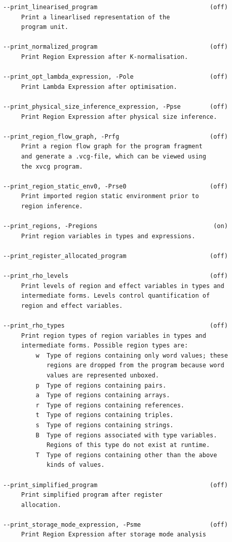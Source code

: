 \documentclass[12pt]{book}
\begin{document}
\begin{verbatim}
--print_linearised_program                               (off)
     Print a linearlised representation of the
     program unit.

--print_normalized_program                               (off)
     Print Region Expression after K-normalisation.

--print_opt_lambda_expression, -Pole                     (off)
     Print Lambda Expression after optimisation.

--print_physical_size_inference_expression, -Ppse        (off)
     Print Region Expression after physical size inference.

--print_region_flow_graph, -Prfg                         (off)
     Print a region flow graph for the program fragment
     and generate a .vcg-file, which can be viewed using
     the xvcg program.

--print_region_static_env0, -Prse0                       (off)
     Print imported region static environment prior to
     region inference.

--print_regions, -Pregions                                (on)
     Print region variables in types and expressions.

--print_register_allocated_program                       (off)

--print_rho_levels                                       (off)
     Print levels of region and effect variables in types and
     intermediate forms. Levels control quantification of
     region and effect variables.

--print_rho_types                                        (off)
     Print region types of region variables in types and
     intermediate forms. Possible region types are:
         w  Type of regions containing only word values; these
            regions are dropped from the program because word
            values are represented unboxed.
         p  Type of regions containing pairs.
         a  Type of regions containing arrays.
         r  Type of regions containing references.
         t  Type of regions containing triples.
         s  Type of regions containing strings.
         B  Type of regions associated with type variables.
            Regions of this type do not exist at runtime.
         T  Type of regions containing other than the above
            kinds of values.

--print_simplified_program                               (off)
     Print simplified program after register
     allocation.

--print_storage_mode_expression, -Psme                   (off)
     Print Region Expression after storage mode analysis


\end{verbatim}
\end{document}
